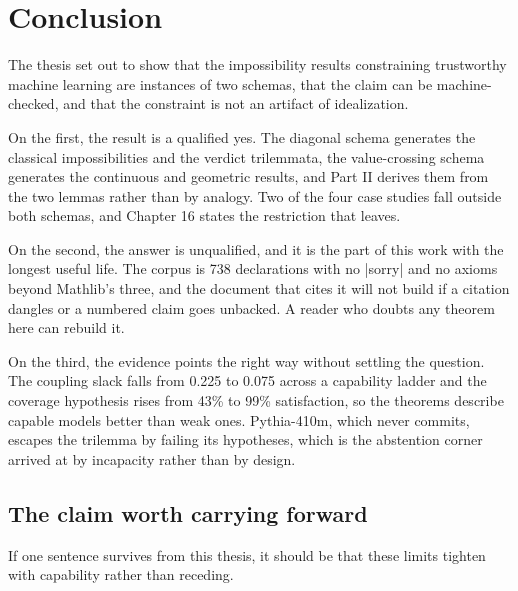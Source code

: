 \documentclass{memoir}
\begin{document}
\chapter{Conclusion}\label{Two--Schemas--of--Impossibility-005F-005F-005F--Machine--Checked--Limits--of--Trustworthy--Machine--Learning-005F-005F-005F--and--Why--They--Tighten--with--Capability----Conclusion}

The thesis set out to show that the impossibility results constraining
trustworthy machine learning are instances of two schemas, that the claim can be
machine-checked, and that the constraint is not an artifact of idealization.

On the first, the result is a qualified yes. The diagonal schema generates the
classical impossibilities and the verdict trilemmata, the value-crossing schema
generates the continuous and geometric results, and Part II derives them from
the two lemmas rather than by analogy. Two of the four case studies fall outside
both schemas, and Chapter 16 states the restriction that leaves.

On the second, the answer is unqualified, and it is the part of this work with
the longest useful life. The corpus is 738 declarations with no \LeanVerb|sorry| and no
axioms beyond Mathlib's three, and the document that cites it will not build if
a citation dangles or a numbered claim goes unbacked. A reader who doubts any
theorem here can rebuild it.

On the third, the evidence points the right way without settling the question.
The coupling slack falls from 0.225 to 0.075 across a capability ladder and the
coverage hypothesis rises from 43\% to 99\% satisfaction, so the theorems describe
capable models better than weak ones. Pythia-410m, which never commits, escapes
the trilemma by failing its hypotheses, which is the abstention corner arrived at
by incapacity rather than by design.



\section{The claim worth carrying forward}\label{Two--Schemas--of--Impossibility-005F-005F-005F--Machine--Checked--Limits--of--Trustworthy--Machine--Learning-005F-005F-005F--and--Why--They--Tighten--with--Capability----Conclusion----The--claim--worth--carrying--forward}

If one sentence survives from this thesis, it should be that these limits
tighten with capability rather than receding.
\end{document}
